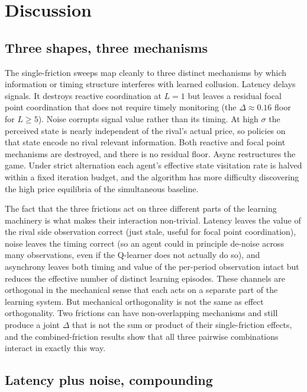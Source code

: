 \section{Discussion}
\label{sec:discussion}

\subsection{Three shapes, three mechanisms}

The single-friction sweeps map cleanly to three distinct mechanisms by which information or timing structure interferes with learned collusion. Latency delays signals. It destroys reactive coordination at $L=1$ but leaves a residual focal point coordination that does not require timely monitoring (the $\Delta\approx 0.16$ floor for $L\geq 5$). Noise corrupts signal value rather than its timing. At high $\sigma$ the perceived state is nearly independent of the rival's actual price, so policies on that state encode no rival relevant information. Both reactive and focal point mechanisms are destroyed, and there is no residual floor. Async restructures the game. Under strict alternation each agent's effective state visitation rate is halved within a fixed iteration budget, and the algorithm has more difficulty discovering the high price equilibria of the simultaneous baseline.

The fact that the three frictions act on three different parts of the learning machinery is what makes their interaction non-trivial. Latency leaves the value of the rival side observation correct (just stale, useful for focal point coordination), noise leaves the timing correct (so an agent could in principle de-noise across many observations, even if the Q-learner does not actually do so), and asynchrony leaves both timing and value of the per-period observation intact but reduces the effective number of distinct learning episodes. These channels are orthogonal in the mechanical sense that each acts on a separate part of the learning system. But mechanical orthogonality is not the same as effect orthogonality. Two frictions can have non-overlapping mechanisms and still produce a joint $\Delta$ that is not the sum or product of their single-friction effects, and the combined-friction results show that all three pairwise combinations interact in exactly this way.

\subsection{Latency plus noise, compounding}

